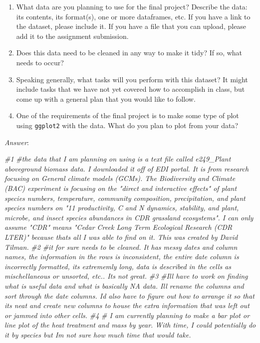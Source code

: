 \documentclass[
]{article}
\newenvironment{Shaded}{\begin{snugshade}}{\end{snugshade}}
\newcommand{\CommentTok}[1]{\textcolor[rgb]{0.56,0.35,0.01}{\textit{#1}}}
\begin{document}
\begin{enumerate}
\def\labelenumi{\arabic{enumi}.}
\item
  What data are you planning to use for the final project? Describe the
  data: its contents, its format(s), one or more dataframes, etc. If you
  have a link to the dataset, please include it. If you have a file that
  you can upload, please add it to the assignment submission.
\item
  Does this data need to be cleaned in any way to make it tidy? If so,
  what needs to occur?
\item
  Speaking generally, what tasks will you perform with this dataset? It
  might include tasks that we have not yet covered how to accomplish in
  class, but come up with a general plan that you would like to follow.
\item
  One of the requirements of the final project is to make some type of
  plot using \texttt{ggplot2} with the data. What do you plan to plot
  from your data?
\end{enumerate}

\emph{Answer}:

\begin{Shaded}
\begin{Highlighting}[]
\CommentTok{\#1}
\CommentTok{\#the data that I am planning on using is a text file called e249\_Plant aboveground biomass data. I downloaded it off of EDI portal. It is from research focusing on General climate models (GCMs). The Biodiversity and Climate (BAC) experiment is focusing on the "direct and interactive effects" of plant species numbers, temperature, community composition, precipitation, and plant species numbers on "11 productivity, C and N dynamics, stability, and plant, microbe, and insect species abundances in CDR grassland ecosystems". I can only assume "CDR" means "Cedar Creek Long Term Ecological Research (CDR LTER)" because that\textquotesingle{}s all I was able to find on it. This was created by David Tilman.}
\CommentTok{\#2}
\CommentTok{\#it for sure needs to be cleaned. It has messy dates and column names, the information in the rows is inconsistent, the entire date column is incorrectly formatted, it\textquotesingle{}s extrememly long, data is described in the cells as mischellaneous or unsorted, etc.. It\textquotesingle{}s not great. }
\CommentTok{\#3}
\CommentTok{\#I\textquotesingle{}ll have to work on finding what is useful data and what is basically NA data. I\textquotesingle{}ll rename the columns and sort through the date columns. I\textquotesingle{}d also have to figure out how to arrange it so that it\textquotesingle{}s neat and create new columns to house the extra information that was left out or jammed into other cells.}
\CommentTok{\#4}
\CommentTok{\# I am currently planning to make a bar plot or line plot of the heat treatment and mass by year. With time, I could potentially do it by species but I\textquotesingle{}m not sure how much time that would take. }
\end{Highlighting}
\end{Shaded}
\end{document}
